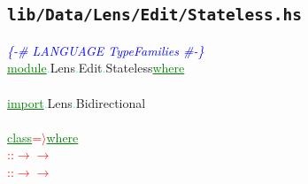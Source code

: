 \subsection{\texttt{lib/Data/Lens/Edit/Stateless.hs}}
\label{mod:Data.Lens.Edit.Stateless}
\textcolor{blue}{{\it{}\{-\# LANGUAGE TypeFamilies \#-\}}}\\\textcolor{green}{\underline{module}}\textcolor{cyan}{.}{\rm{}Lens}\textcolor{cyan}{.}{\rm{}Edit}\textcolor{cyan}{.}{\rm{}Stateless}\hsspace \textcolor{green}{\underline{where}}\\\\\textcolor{green}{\underline{import}}\textcolor{cyan}{.}{\rm{}Lens}\textcolor{cyan}{.}{\rm{}Bidirectional}\\\\\textcolor{green}{\underline{class}}\hsspace \textcolor{red}{=\ensuremath{\rangle}}\hsspace \textcolor{green}{\underline{where}}\\\hsspace \textcolor{red}{::}\hsspace \textcolor{red}{\ensuremath{\rightarrow}}\hsspace \textcolor{red}{\ensuremath{\rightarrow}}\\\hsspace \textcolor{red}{::}\hsspace \textcolor{red}{\ensuremath{\rightarrow}}\hsspace \textcolor{red}{\ensuremath{\rightarrow}}\\
